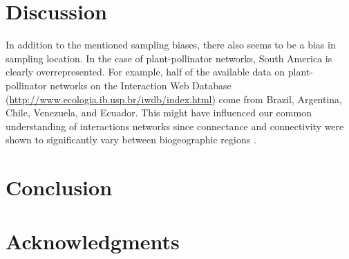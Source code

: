 \documentclass[12pt,a4paper]{article}
\begin{document}
\newpage
	\section{Discussion}


In addition to the mentioned sampling biases, there also seems to be a bias in sampling location. In the case of plant-pollinator networks, South America is clearly overrepresented. For example, half of the available data on plant-pollinator networks on the Interaction Web Database (\url{http://www.ecologia.ib.usp.br/iwdb/index.html}) come from Brazil, Argentina, Chile, Venezuela, and Ecuador. This might have influenced our common understanding of interactions networks since connectance and connectivity were shown to significantly vary between biogeographic regions \parencite{Oelsen2002}.





\section{Conclusion}
\section{Acknowledgments}
\newpage
\end{document}
